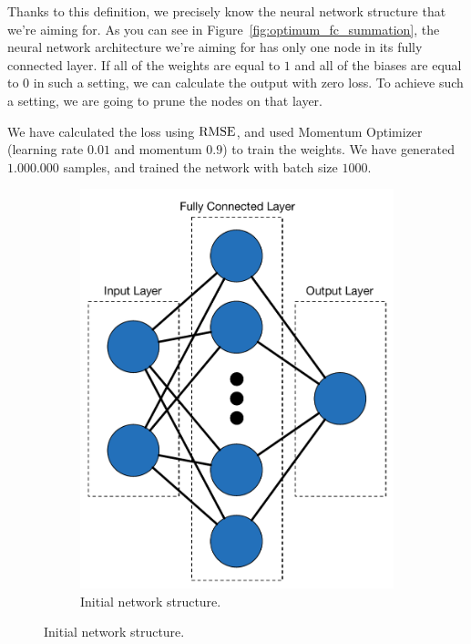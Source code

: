 Thanks to this definition, we precisely know the neural network structure that we're aiming for. As you can see in Figure~\ref{fig:optimum_fc_summation}, the neural network architecture we're aiming for has only one node in its fully connected layer. If all of the weights are equal to $1$ and all of the biases are equal to $0$ in such a setting, we can calculate the output with zero loss. To achieve such a setting, we are going to prune the nodes on that layer.

We have calculated the loss using $\textrm{RMSE}$, and used Momentum Optimizer (learning rate $0.01$ and momentum $0.9$) to train the weights. We have generated $1.000.000$ samples, and trained the network with batch size $1000$.

\begin{figure}[h!]
  \begin{center}
  \begin{subfigure}{.5\textwidth}
    \begin{center}
        \includegraphics[width=.9\linewidth]{images/large_fc_summation.pdf}
        \caption{Initial network structure.}
        \label{fig:large_fc_summation}
      \end{center}

\end{subfigure}
\end{center}
\end{figure}
